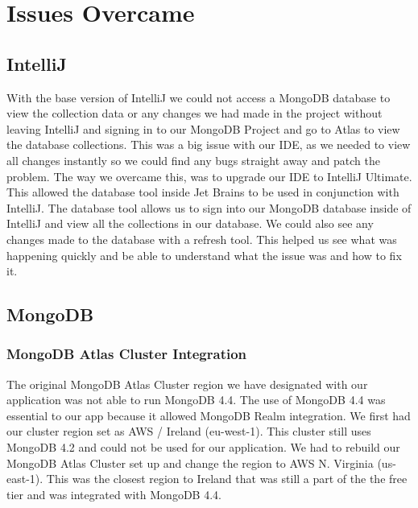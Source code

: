 \section {Issues Overcame}
\subsection{IntelliJ}
With the base version of IntelliJ we could not access a MongoDB database to view the collection data or any changes we had made in the project without leaving IntelliJ and signing in to our MongoDB Project and go to Atlas to view the database collections. This was a big issue with our IDE, as we needed to view all changes instantly so we could find any bugs straight away and patch the problem. \newline \newline \newline
The way we overcame this, was to upgrade our IDE to IntelliJ Ultimate. This allowed the database tool inside Jet Brains to be used in conjunction with IntelliJ. The database tool allows us to sign into our MongoDB database inside of IntelliJ and view all the collections in our database. We could also see any changes made to the database with a refresh tool. This helped us see what was happening quickly and be able to understand what the issue was and how to fix it.
\subsection{MongoDB}
\subsubsection{MongoDB Atlas Cluster Integration}
The original MongoDB Atlas Cluster region we have designated with our application was not able to run MongoDB 4.4. The use of MongoDB 4.4 was essential to our app because it allowed MongoDB Realm integration. We first had our cluster region set as AWS / Ireland (eu-west-1). This cluster still uses MongoDB 4.2 and could not be used for our application. We had to rebuild our MongoDB Atlas Cluster set up and change the region to AWS N. Virginia (us-east-1). This was the closest region to Ireland that was still a part of the the free tier and was integrated with MongoDB 4.4.\cite{ref8}

